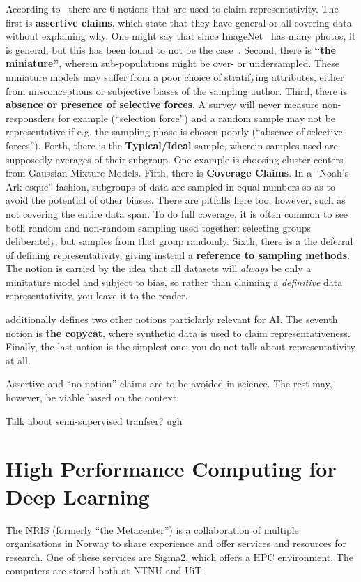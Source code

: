 \documentclass[10pt,twocolumn,letterpaper]{article}
\begin{document}
According to~\cite{krusk1,krusk2} there are 6 notions that are used to claim representativity.
The first is \textbf{assertive claims}, which state that they have general or all-covering data without explaining why. One might say that since ImageNet~\cite{imageNet} has many photos, it is general, but this has been found to not be the case~\cite{biasedImagenet}.
Second, there is \textbf{``the miniature''}, wherein sub-populations might be over- or undersampled. These miniature models may suffer from a poor choice of stratifying attributes, either from misconceptions or subjective biases of the sampling author.
Third, there is \textbf{absence or presence of selective forces}. A survey will never measure non-responsders for example (``selection force'') and a random sample may not be representative if e.g. the sampling phase is chosen poorly (``absence of selective forces'').
Forth, there is the \textbf{Typical/Ideal} sample, wherein samples used are supposedly averages of their subgroup. One example is choosing cluster centers from Gaussian Mixture Models.
Fifth, there is \textbf{Coverage Claims}. In a ``Noah's Ark-esque'' fashion, subgroups of data are sampled in equal numbers so as to avoid the potential of other biases. There are pitfalls here too, however, such as not covering the entire data span. To do full coverage, it is often common to see both random and non-random sampling used together: selecting groups deliberately, but samples from that group randomly.
Sixth, there is a the deferral of defining representativity, giving instead a \textbf{reference to sampling methods}. The notion is carried by the idea that all datasets will \textit{always} be only a minitature model and subject to bias, so rather than claiming a \textit{definitive} data representativity, you leave it to the reader. 

 additionally defines two other notions particlarly relevant for \gls{AI}. The seventh notion is \textbf{the copycat}, where synthetic data is used to claim representativeness. Finally, the last notion is the simplest one: you do not talk about representativity at all. 

Assertive and ``no-notion''-claims are to be avoided in science. The rest may, however, be viable based on the context.

Talk about semi-supervised tranfser? ugh

\section{High Performance Computing for Deep Learning}\label{sec:hpc}
The \gls{NRIS} (formerly ``the Metacenter'') is a collaboration of multiple organisations in Norway to share experience and offer services and resources for research. One of these services are Sigma2, which offers a \gls{HPC} environment. The computers are stored both at NTNU and UiT.
\end{document}
